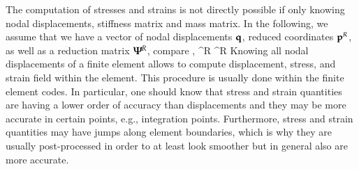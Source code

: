 %


%
The computation of stresses and strains is not directly possible if only knowing nodal displacements, stiffness matrix and mass matrix.
In the following, we assume that we have a vector of nodal displacements $\mathbf{q}$, reduced coordinates $\mathbf{p}^{R}$, as well as a reduction matrix $\mbox{\boldmath $\Psi$ \unboldmath}\!\!^{R}$, compare ,
\be \label{theory:eigenmodes:HCB2}
  \qv \approx \tPsi^{R} \pv^{R} \eqDot
\ee
Knowing all nodal displacements of a finite element allows to compute displacement, stress, and strain field within the element. This procedure is usually done within the finite element codes.
In particular, one should know that stress and strain quantities are having a lower order of accuracy than displacements and they may be more accurate in certain points, e.g., integration points. Furthermore, stress and strain quantities may have jumps along element boundaries, which is why they are usually post-processed in order to at least look smoother but in general also are more accurate.

